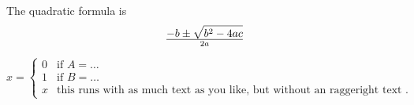 The quadratic formula is $$-b \pm \sqrt{b^2 - 4ac} \over 2a$$
\bye

\makeatletter
 \newcommand{\be}{%
 \begingroup
 \eqnarray%
 \@ifstar{\nonumber}{}%
  }
  \newcommand{\ee}{\endeqnarray\endgroup}
  \makeatother

 \begin{equation}
 x=\left\{ \begin{array}{cl}
 0 & \textrm{if }A=\ldots\\
 1 & \textrm{if }B=\ldots\\
 x & \textrm{this runs with as much text as you like, but without an raggeright text
.}\end{array}\right.
 \end{equation}